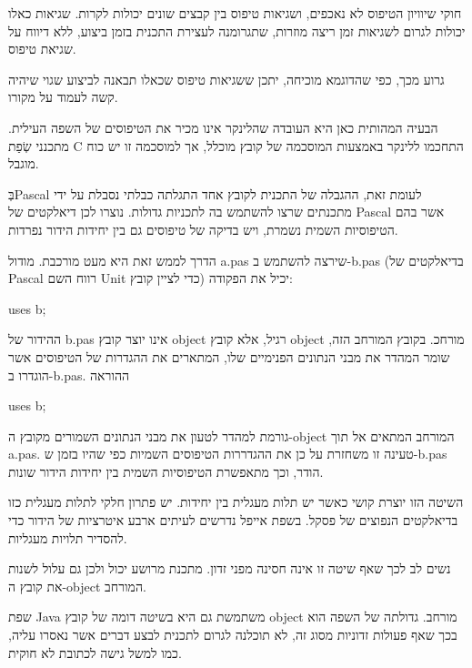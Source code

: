       חוקי שיוויון הטיפוס לא נאכפים, ושגיאות טיפוס בין קבצים שונים יכולות לקרות. שגיאות כאלו יכולות לגרום לשגיאות זמן ריצה מוזרות, שתגרומנה לעצירת התכנית בזמן ביצוע, ללא דיווח על שגיאת טיפוס.

      גרוע מכך, כפי שהדוגמא מוכיחה, יתכן ששגיאות טיפוס שכאלו תבאנה לביצוע שגוי שיהיה קשה לעמוד על מקורו.

      הבעיה המהותית כאן היא העובדה שהלינקר אינו מכיר את הטיפוסים של השפה העילית. מתכנני שְׂפַת C התחכמו ללינקר באמצעות המוסכמה של קובץ מוכלל, אך למוסכמה זו יש כוח מוגבל.

      בְּPascal לעומת זאת, ההגבלה של התכנית לקובץ אחד התגלתה כבלתי נסבלת על ידי מתכנתים שרצו להשתמש בה לתכניות גדולות. נוצרו לכן דיאלקטים של Pascal אשר בהם הטיפוסיות השמית נשמרת, ויש בדיקה של טיפוסים גם בין יחידות הידור נפרדות.

      הדרך לממש זאת היא מעט מורכבת. מודול a.pas שירצה להשתמש ב-b.pas (בדיאלקטים של Pascal רווח השם Unit כדי לציין קובץ) יכיל את הפקודה:

      uses b;

      ההידור של b.pas אינו יוצר קובץ object רגיל, אלא קובץ object מורחכ. בקובץ המורחב הזה, שומר המהדר את מבני הנתונים הפנימיים שלו, המתארים את ההגדרות של הטיפוסים אשר הוגדרו ב-b.pas. ההוראה

      uses b;

      גורמת למהדר לטעון את מבני הנתונים השמורים מקובץ ה-object המורחב המתאים אל תוך a.pas. טעינה זו משחזרת על כן את ההגדררות הטיפוסים השמיות כפי שהיו בזמן ש-b.pas הודר, וכך מתאפשרת הטיפוסיות השמית בין יחידות הידור שונות.

      השיטה הזו יוצרת קושי כאשר יש תלות מעגלית בין יחידות. יש פתרון חלקי לתלות מעגלית כזו בדיאלקטים הנפוצים של פסקל. בשפת אייפל נדרשים לעיתים ארבע איטרציות של הידור כדי להסדיר תלויות מעגליות.

      נשים לב לכך שאף שיטה זו אינה חסינה מפני זדון. מתכנת מרושע יכול ולכן גם עלול לשנות את קובץ ה-object המורחב.

      שפת Java משתמשת גם היא בשיטה דומה של קובץ object מורחב. גדולתה של השפה הוא בכך שאף פעולות זדוניות מסוג זה, לא תוכלנה לגרום לתכנית לבצע דברים אשר נאסרו עליה, כמו למשל גישה לכתובת לא חוקית.

